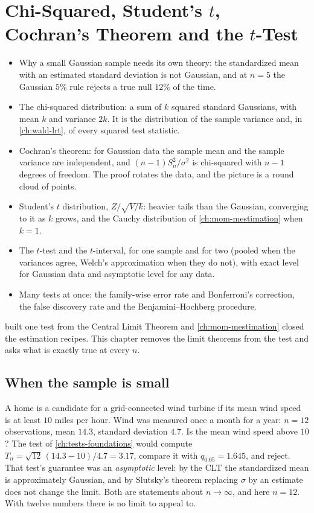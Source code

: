 \chapter[The $t$-Test]{Chi-Squared, Student's $t$, Cochran's Theorem and the $t$-Test}
\label{ch:t-test}

\begin{chaptergoals}
\begin{itemize}[nosep]
\item Why a small Gaussian sample needs its own theory: the standardized mean with an estimated standard deviation is not Gaussian, and at $n = 5$ the Gaussian $5\%$ rule rejects a true null $12\%$ of the time.
\item The chi-squared distribution: a sum of $k$ squared standard Gaussians, with mean $k$ and variance $2k$. It is the distribution of the sample variance and, in \cref{ch:wald-lrt}, of every squared test statistic.
\item Cochran's theorem: for Gaussian data the sample mean and the sample variance are independent, and $(n-1)S_n^2/\sigma^2$ is chi-squared with $n - 1$ degrees of freedom. The proof rotates the data, and the picture is a round cloud of points.
\item Student's $t$ distribution, $Z/\sqrt{V/k}$: heavier tails than the Gaussian, converging to it as $k$ grows, and the Cauchy distribution of \cref{ch:mom-mestimation} when $k = 1$.
\item The $t$-test and the $t$-interval, for one sample and for two (pooled when the variances agree, Welch's approximation when they do not), with exact level for Gaussian data and asymptotic level for any data.
\item Many tests at once: the family-wise error rate and Bonferroni's correction, the false discovery rate and the Benjamini--Hochberg procedure.
\end{itemize}
 built one test from the Central Limit Theorem and \cref{ch:mom-mestimation} closed the estimation recipes. This chapter removes the limit theorems from the test and asks what is exactly true at every $n$.
\end{chaptergoals}

\section{When the sample is small}
\label{sec:t-small}

A home is a candidate for a grid-connected wind turbine if its mean wind speed is at least $10$ miles per hour.
Wind was measured once a month for a year: $n = 12$ observations, mean $14.3$, standard deviation $4.7$.
Is the mean wind speed above $10$?
The test of \cref{ch:tests-foundations} would compute $T_n = \sqrt{12}\,(14.3 - 10)/4.7 = 3.17$, compare it with $q_{0.05} = 1.645$, and reject.
That test's guarantee was an \textit{asymptotic} level: by the CLT the standardized mean is approximately Gaussian, and by Slutsky's theorem replacing $\sigma$ by an estimate does not change the limit.
Both are statements about $n \to \infty$, and here $n = 12$.
With twelve numbers there is no limit to appeal to.


